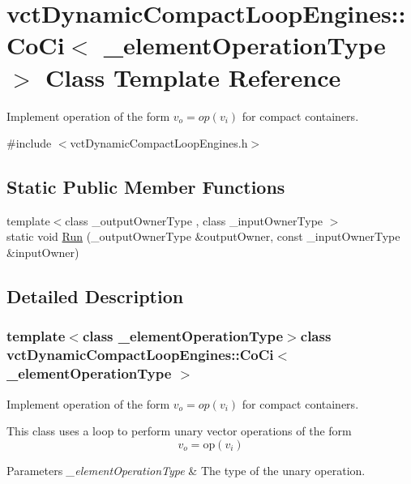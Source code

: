 \hypertarget{classvct_dynamic_compact_loop_engines_1_1_co_ci}{\section{vct\-Dynamic\-Compact\-Loop\-Engines\-:\-:Co\-Ci$<$ \-\_\-element\-Operation\-Type $>$ Class Template Reference}
\label{classvct_dynamic_compact_loop_engines_1_1_co_ci}
}


Implement operation of the form $v_o = op(v_i)$ for compact containers.  




{\ttfamily \#include $<$vct\-Dynamic\-Compact\-Loop\-Engines.\-h$>$}

\subsection*{Static Public Member Functions}
\begin{DoxyCompactItemize}
\item 
{\footnotesize template$<$class \-\_\-output\-Owner\-Type , class \-\_\-input\-Owner\-Type $>$ }\\static void \hyperlink{classvct_dynamic_compact_loop_engines_1_1_co_ci_a555df15ceb109da0d6577e952e550e79}{Run} (\-\_\-output\-Owner\-Type \&output\-Owner, const \-\_\-input\-Owner\-Type \&input\-Owner)
\end{DoxyCompactItemize}


\subsection{Detailed Description}
\subsubsection*{template$<$class \-\_\-element\-Operation\-Type$>$class vct\-Dynamic\-Compact\-Loop\-Engines\-::\-Co\-Ci$<$ \-\_\-element\-Operation\-Type $>$}

Implement operation of the form $v_o = op(v_i)$ for compact containers. 

This class uses a loop to perform unary vector operations of the form \[ v_{o} = \mathrm{op}(v_{i}) \]


\begin{DoxyParams}{Parameters}
{\em \-\_\-element\-Operation\-Type} & The type of the unary operation. \\
\hline
\end{DoxyParams}


